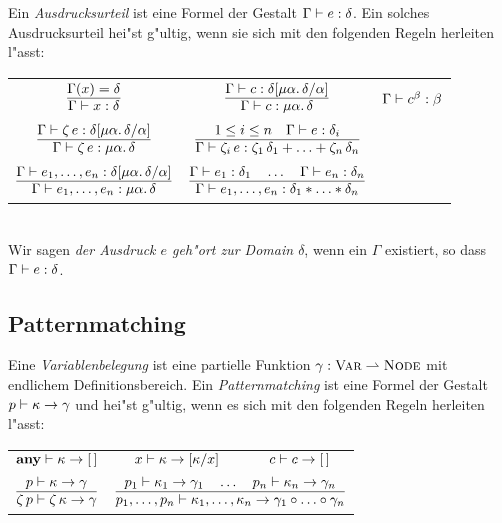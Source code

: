 \documentclass[12pt,a4paper]{article}
\begin{document}
Ein \emph{Ausdrucksurteil} ist eine Formel der Gestalt ${\Gamma}\vdash{e}:{\delta}$. Ein
solches Ausdrucksurteil hei"st g"ultig, wenn sie sich mit den folgenden Regeln herleiten
l"asst: \\[5mm]
\begin{tabular}{ccc}
  $\RULE{\Gamma(x) = \delta}{\ej{\Gamma}{x}{\delta}}$
  & $\RULE{\ej{\Gamma}{c}{\delta[\mu\alpha.\,\delta/\alpha]}}{\ej{\Gamma}{c}{\mu\alpha.\,\delta}}$
  & ${\Gamma}\vdash{c^\beta}:{\beta}$ \\[3mm]
  $\RULE{\ej{\Gamma}{\zeta\,e}{\delta[\mu\alpha.\,\delta/\alpha]}}{\ej{\Gamma}{\zeta\,e}{\mu\alpha.\,\delta}}$
  & $\RULE{1 \le i \le n \quad \ej{\Gamma}{e}{\delta_i}}{\ej{\Gamma}{\zeta_i\,e}{\zeta_1\,\delta_1+\ldots+\zeta_n\,\delta_n}}$ \\[3mm]
  $\RULE{\ej{\Gamma}{e_1,\ldots,e_n}{\delta[\mu\alpha.\,\delta/\alpha]}}{\ej{\Gamma}{e_1,\ldots,e_n}{\mu\alpha.\,\delta}}$
  & $\RULE{\ej{\Gamma}{e_1}{\delta_1} \quad\ldots\quad \ej{\Gamma}{e_n}{\delta_n}}{\ej{\Gamma}{e_1,\ldots,e_n}{\delta_1 * \ldots * \delta_n}}$ \\[3mm]
\end{tabular} \\[3mm]
Wir sagen \emph{der Ausdruck $e$ geh"ort zur Domain $\delta$}, wenn ein $\Gamma$ existiert, so dass
${\Gamma}\vdash{e}:{\delta}$.


\subsection{Patternmatching}

Eine \emph{Variablenbelegung} ist eine partielle Funktion $\gamma:\textsc{Var} \rightharpoonup \textsc{Node}$ mit endlichem
Definitionsbereich. Ein \emph{Patternmatching} ist eine Formel der Gestalt ${p}\vdash{\kappa}\to{\gamma}$
und hei"st g"ultig, wenn es sich mit den folgenden Regeln herleiten l"asst: \\[5mm]
\begin{tabular}{ccc}
  ${\mathbf{any}}\vdash{\kappa}\to{[\,]}$
  & ${x}\vdash{\kappa}\to{[\kappa/x]}$
  & ${c}\vdash{c}\to{[\,]}$ \\[1mm]
  $\RULE{\match{p}{\kappa}{\gamma}}{\match{\zeta\,p}{\zeta\,\kappa}{\gamma}}$
  & \multicolumn{2}{c}{$\RULE{\match{p_1}{\kappa_1}{\gamma_1} \quad\ldots\quad \match{p_n}{\kappa_n}{\gamma_n}}{\match{p_1,\ldots,p_n}{\kappa_1,\ldots,\kappa_n}{\gamma_1 \circ\ldots\circ \gamma_n}}$} \\[3mm]
\end{tabular} \\[3mm]
\end{document}
